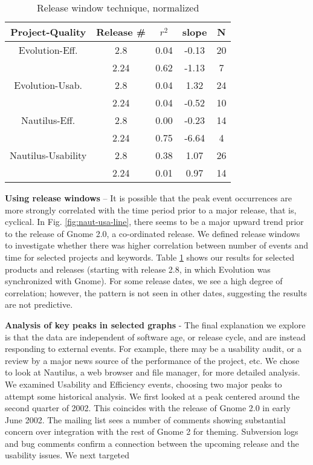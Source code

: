 \documentclass[conference, compsoc]{IEEEtran}
\begin{document}
\begin{table}
	\caption{Release window technique, normalized}
	\centering
	\label{tbl:windows}
\begin{tabular}{|c|c|c|c|c|}
\hline
\rowcolor[gray]{.9} 
Project-Quality & Release \# & $r^2$ & slope & N\\ \hline
Evolution-Eff. & 2.8 & 0.04 & -0.13 & 20 \\
 & 2.24 & 0.62 & -1.13 & 7\\ \hline
Evolution-Usab. & 2.8 & 0.04 & 1.32 & 24\\
 & 2.24 & 0.04 & -0.52 & 10 \\ \hline
Nautilus-Eff. & 2.8 & 0.00 & -0.23 & 14 \\
 & 2.24 & 0.75 & -6.64 & 4 \\ \hline
Nautilus-Usability & 2.8 & 0.38 & 1.07 & 26\\
 & 2.24 & 0.01 & 0.97 & 14\\
\hline
\end{tabular}
\end{table}

\noindent\textbf{Using release windows} -- It is possible that the peak event occurrences are more strongly correlated with the time period prior to a major release, that is, cyclical. In Fig. \ref{fig:naut-usa-line}, there seems to be a major upward trend prior to the release of Gnome 2.0, a co-ordinated release. We defined release windows to investigate whether there was higher correlation between number of events and time for selected projects and keywords. Table \ref{tbl:windows} shows our results for selected products and releases (starting with release 2.8, in which Evolution was synchronized with Gnome). For some release dates, we see a high degree of correlation; however, the pattern is not seen in other dates, suggesting the results are not predictive. 

\noindent\textbf{Analysis of key peaks in selected graphs} - The final explanation we explore is that the data are independent of software age, or release cycle, and are instead responding to external events. For example, there may be a usability audit, or a review by a major news source of the performance of the project, etc. We chose to look at Nautilus, a web browser and file manager, for more detailed analysis. We examined Usability and Efficiency events, choosing two major peaks to attempt some historical analysis. We first looked at a peak centered around the second quarter of 2002. This coincides with the release of Gnome 2.0 in early June 2002. The mailing list sees a number of comments showing substantial concern over integration with the rest of Gnome 2 for theming. Subversion logs and bug comments confirm a connection between the upcoming release and the usability issues. We next targeted 
\end{document}
